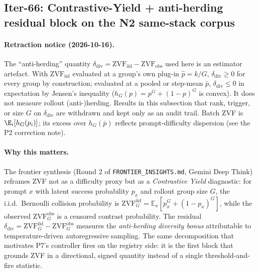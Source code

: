 \subsection{Iter-66: Contrastive-Yield + anti-herding residual block on the N2 same-stack corpus}
\label{sec:p6-zvf-antiherding}

\paragraph{Retraction notice (2026-10-16).} The ``anti-herding'' quantity
$\delta_{\mathrm{div}}=\mathrm{ZVF}_{\mathrm{iid}}-\mathrm{ZVF}_{\mathrm{obs}}$
used here is an estimator artefact. With $\mathrm{ZVF}_{\mathrm{iid}}$
evaluated at a group's own plug-in $\hat p=k/G$, $\delta_{\mathrm{div}}\ge0$
for every group by construction; evaluated at a pooled or step-mean $\bar p$,
$\delta_{\mathrm{div}}\le0$ in expectation by Jensen's inequality ($h_G(p)=p^G+(1-p)^G$
is convex). It does not measure rollout (anti-)herding. Results in this
subsection that rank, trigger, or size $G$ on $\delta_{\mathrm{div}}$ are
withdrawn and kept only as an audit trail. Batch ZVF is $\E_i[h_G(p_i)]$; its
excess over $h_G(\bar p)$ reflects prompt-difficulty dispersion (see the P2
correction note).


\paragraph{Why this matters.}
The frontier synthesis (Round 2 of \texttt{FRONTIER\_INSIGHTS.md},
Gemini Deep Think) reframes ZVF not as a difficulty proxy but as a
\emph{Contrastive Yield} diagnostic:
for prompt $x$ with latent success probability $p_x$ and rollout
group size $G$, the i.i.d.\ Bernoulli collision probability is
$\mathrm{ZVF}^{\mathrm{iid}}_G = \mathbb{E}_x[p_x^G + (1-p_x)^G]$, while
the observed $\mathrm{ZVF}^{\mathrm{obs}}_G$ is a censored contrast
probability. The residual
$\delta_{\mathrm{div}} = \mathrm{ZVF}^{\mathrm{iid}}_G -
\mathrm{ZVF}^{\mathrm{obs}}_G$ measures the \emph{anti-herding diversity
bonus} attributable to temperature-driven autoregressive sampling. The
same decomposition that motivates P7's controller fires on the registry
side: it is the first block that grounds ZVF in a directional, signed
quantity instead of a single threshold-and-fire statistic.

